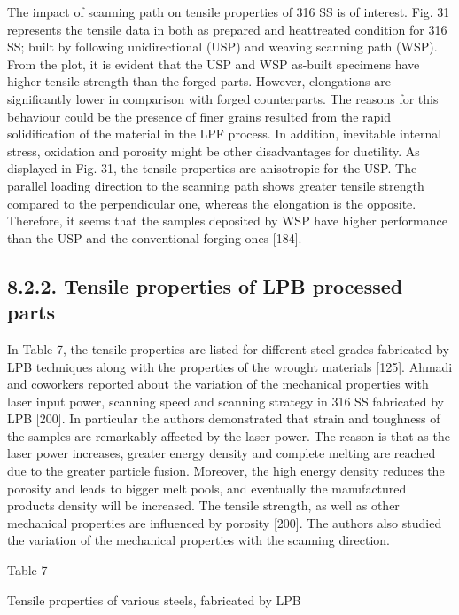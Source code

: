 \documentclass[10pt]{article}
\begin{document}
The impact of scanning path on tensile properties of 316 SS is of interest. Fig. 31 represents the tensile data in both as prepared and heattreated condition for 316 SS; built by following unidirectional (USP) and weaving scanning path (WSP). From the plot, it is evident that the USP and WSP as-built specimens have higher tensile strength than the forged parts. However, elongations are significantly lower in comparison with forged counterparts. The reasons for this behaviour could be the presence of finer grains resulted from the rapid solidification of the material in the LPF process. In addition, inevitable internal stress, oxidation and porosity might be other disadvantages for ductility. As displayed in Fig. 31, the tensile properties are anisotropic for the USP. The parallel loading direction to the scanning path shows greater tensile strength compared to the perpendicular one, whereas the elongation is the opposite. Therefore, it seems that the samples deposited by WSP have higher performance than the USP and the conventional forging ones [184].

\subsection*{8.2.2. Tensile properties of LPB processed parts}
In Table 7, the tensile properties are listed for different steel grades fabricated by LPB techniques along with the properties of the wrought materials [125]. Ahmadi and coworkers reported about the variation of the mechanical properties with laser input power, scanning speed and scanning strategy in 316 SS fabricated by LPB [200]. In particular the authors demonstrated that strain and toughness of the samples are remarkably affected by the laser power. The reason is that as the laser power increases, greater energy density and complete melting are reached due to the greater particle fusion. Moreover, the high energy density reduces the porosity and leads to bigger melt pools, and eventually the manufactured products density will be increased. The tensile strength, as well as other mechanical properties are influenced by porosity [200]. The authors also studied the variation of the mechanical properties with the scanning direction.

Table 7

Tensile properties of various steels, fabricated by LPB
\end{document}
